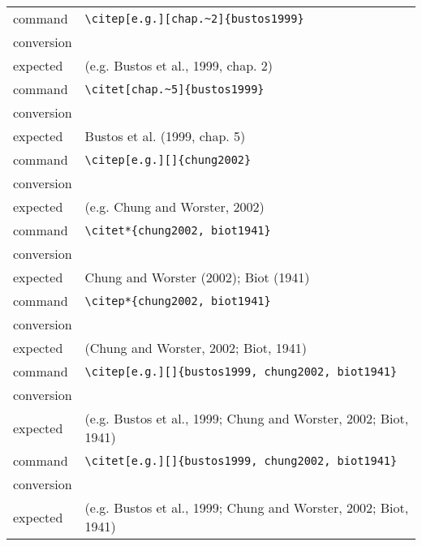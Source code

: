 \documentclass{article}
\begin{document}
\begin{tabular}{ll}


command&\verb#\citep[e.g.][chap.~2]{bustos1999}#\\
conversion&\citep[e.g.][chap.~2]{bustos1999} \\
expected&(e.g. Bustos et al., 1999, chap. 2)\\
\hline



command&\verb#\citet[chap.~5]{bustos1999}#\\
conversion&\citet[chap.~5]{bustos1999}\\
expected&Bustos et al. (1999, chap. 5)\\
\hline


command&\verb#\citep[e.g.][]{chung2002}#\\
conversion&\citep[e.g.][]{chung2002} \\
expected&(e.g. Chung and Worster, 2002)\\
\hline

command&\verb#\citet*{chung2002, biot1941}#\\
conversion&\citet*{chung2002, biot1941}\\
expected&Chung and Worster (2002); Biot (1941)\\
\hline
command&\verb#\citep*{chung2002, biot1941}#\\
conversion&\citep*{chung2002, biot1941}\\
expected&(Chung and Worster, 2002; Biot, 1941)\\
\hline

command&\verb#\citep[e.g.][]{bustos1999, chung2002, biot1941}#\\
conversion&\citep[e.g.][]{bustos1999, chung2002, biot1941} \\
expected&(e.g. Bustos et al., 1999; Chung and Worster, 2002; Biot, 1941)\\

\hline
command&\verb#\citet[e.g.][]{bustos1999, chung2002, biot1941}#\\
conversion&\citep[e.g.][]{bustos1999, chung2002, biot1941} \\
expected&(e.g. Bustos et al., 1999; Chung and Worster, 2002; Biot, 1941)\\

\end{tabular}


\end{document}
